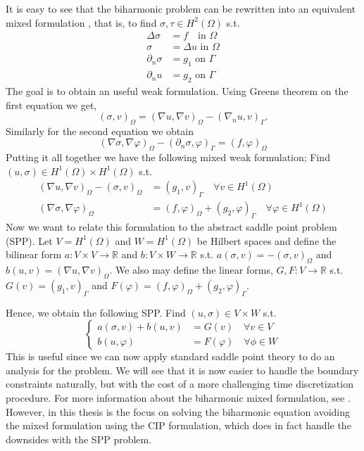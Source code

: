 \documentclass[11pt]{article}
\theoremstyle{remark}
\numberwithin{equation}{section}
\begin{document}
It is easy to see that the biharmonic problem can be rewritten into an equivalent mixed formulation , that is, to find $\sigma, \tau  \in H^2( \Omega ) $ s.t. \[
    \begin{split}
\Delta \sigma  & = f \quad  \text{in } \Omega \\
\sigma   & = \Delta u  \text{ in } \Omega \\
\partial _{n} \sigma  & = g_{1} \text{ on } \Gamma  \\
\partial _{n} u   & = g_{2} \text{ on } \Gamma
    \end{split}
\]
The goal is to obtain an useful weak formulation. Using Greens theorem on the first equation we get,
\[
( \sigma, v)_{\Omega } = ( \nabla  u , \nabla v  )_{\Omega } - ( \nabla _{n} u , v) _{\Gamma }.
\]
Similarly for the second equation we obtain
\[
( \nabla \sigma , \nabla \varphi  )_{\Omega} - ( \partial _{n} \sigma ,  \varphi )_{\Gamma } = ( f,\varphi ) _{\Omega}
\]
Putting it all together we have the following mixed weak formulation; Find $( u, \sigma ) \in H^{1}( \Omega ) \times H^{1}( \Omega )  $ s.t. \[
    \begin{split}
     ( \nabla  u , \nabla v  )_{\Omega } -( \sigma, v)_{\Omega }  & =   ( g_{1} , v) _{\Gamma } \quad  \forall v \in H^{1}( \Omega ) \\
( \nabla \sigma , \nabla \varphi  )_{\Omega}  & = ( f,\varphi ) _{\Omega} + ( g_{2} ,  \varphi )_{\Gamma } \quad  \forall \varphi \in H^{1}( \Omega )
    \end{split}
\]
Now we want to relate this formulation to the abstract saddle point problem (SPP).
Let $V = H^{1}( \Omega ) $  and $W=H^{1}( \Omega ) $ be  Hilbert spaces and define the bilinear form $a: V\times V \to \mathbb{R}  $ and $b: V \times W \to \mathbb{R} $ s.t. $a( \sigma,v ) = - ( \sigma , v) _{\Omega }  $ and $b( u,v) = ( \nabla u,
\nabla v)_{\Omega  }  $. We also may define the linear forms, $G,F: V \to \mathbb{R} $ s.t. $ G( v)  = ( g_{1}, v) _{\Gamma } $ and $F( \varphi ) = ( f, \varphi )_{\Omega } + ( g_{2}, \varphi )_{\Gamma } $.

Hence, we obtain the following SPP. Find $( u,\sigma ) \in V \times W$ s.t.  \[
    \begin{cases}
       a( \sigma ,v) + b ( u, v )  & = G( v)   \quad  \forall v \in V \\
       b( u, \varphi  )  & = F( \varphi )     \quad \forall \phi \in W
    \end{cases}
\]
This is useful since we can now apply standard saddle point theory to do an analysis for the problem. We will see that it is now easier to handle the boundary constraints naturally, but with the cost of a more challenging time discretization
procedure.
For more information about the biharmonic mixed formulation, see \cite{babuvska1980analysis,cai2023nitsche}.
However, in this thesis is the focus on solving the biharmonic equation avoiding the mixed formulation using the CIP formulation, which does in fact handle the downsides with the SPP problem.
\end{document}
